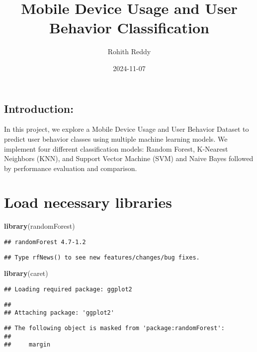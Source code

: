 \documentclass[
]{article}
\title{Mobile Device Usage and User Behavior Classification}
\author{Rohith Reddy}
\date{2024-11-07}
\newenvironment{Shaded}{\begin{snugshade}}{\end{snugshade}}
\newcommand{\FunctionTok}[1]{\textcolor[rgb]{0.13,0.29,0.53}{\textbf{#1}}}
\newcommand{\NormalTok}[1]{#1}
\begin{document}
\maketitle

\subsection{Introduction:}\label{introduction}

In this project, we explore a Mobile Device Usage and User Behavior
Dataset to predict user behavior classes using multiple machine learning
models. We implement four different classification models: Random
Forest, K-Nearest Neighbors (KNN), and Support Vector Machine (SVM) and
Naive Bayes followed by performance evaluation and comparison.

\section{Load necessary libraries}\label{load-necessary-libraries}

\begin{Shaded}
\begin{Highlighting}[]
\FunctionTok{library}\NormalTok{(randomForest)}
\end{Highlighting}
\end{Shaded}

\begin{verbatim}
## randomForest 4.7-1.2
\end{verbatim}

\begin{verbatim}
## Type rfNews() to see new features/changes/bug fixes.
\end{verbatim}

\begin{Shaded}
\begin{Highlighting}[]
\FunctionTok{library}\NormalTok{(caret)}
\end{Highlighting}
\end{Shaded}

\begin{verbatim}
## Loading required package: ggplot2
\end{verbatim}

\begin{verbatim}
## 
## Attaching package: 'ggplot2'
\end{verbatim}

\begin{verbatim}
## The following object is masked from 'package:randomForest':
## 
##     margin
\end{verbatim}
\end{document}
